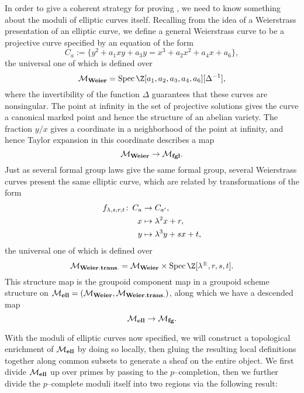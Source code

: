In order to give a coherent strategy for proving , we need to know something about the moduli of elliptic curves itself.  Recalling from  the idea of a Weierstrass presentation of an elliptic curve, we define a general Weierstrass curve to be a projective curve specified by an equation of the form \[C_a := \{y^2 + a_1xy + a_3y = x^3 + a_2x^2 + a_4x + a_6\},\] the universal one of which is defined over \[\moduli{Weier} = \Spec \Z[a_1, a_2, a_3, a_4, a_6][\Delta^{-1}],\] where the invertibility of the function $\Delta$ guarantees that these curves are nonsingular.  The point at infinity in the set of projective solutions gives the curve a canonical marked point and hence the structure of an abelian variety.  The fraction $y/x$ gives a coordinate in a neighborhood of the point at infinity, and hence Taylor expansion in this coordinate describes a map \[\mathcal{M}_{\mathbf{Weier}} \to \mathcal{M}_{\mathbf{fgl}}.\]  Just as several formal group laws give the same formal group, several Weierstrass curves present the same elliptic curve, which are related by transformations of the form
\begin{align*}
f_{\lambda,s,r,t} \colon\thinspace C_a & \to C_{a'}, \\
x & \mapsto \lambda^2 x + r, \\
y & \mapsto \lambda^3 y + sx + t,
\end{align*}
the universal one of which is defined over \[\moduli{Weier.trans.} = \moduli{Weier} \times \Spec \Z[\lambda^{\pm}, r, s, t].\]  This structure map is the groupoid component map in a groupoid scheme structure on $\mathcal{M}_{\mathbf{ell}} = (\mathcal{M}_{\mathbf{Weier}}, \mathcal{M}_{\mathbf{Weier.trans.}})$, along which we have a descended map \[\mathcal{M}_{\mathbf{ell}} \to \mathcal{M}_{\mathbf{fg}}.\]

With the moduli of elliptic curves now specified, we will construct a topological enrichment of $\mathcal{M}_{\mathbf{ell}}$ by doing so locally, then gluing the resulting local definitions together along common subsets to generate a sheaf on the entire object.  We first divide $\mathcal{M}_{\mathbf{ell}}$ up over primes by passing to the $p$--completion, then we further divide the $p$--complete moduli itself into two regions via the following result:

